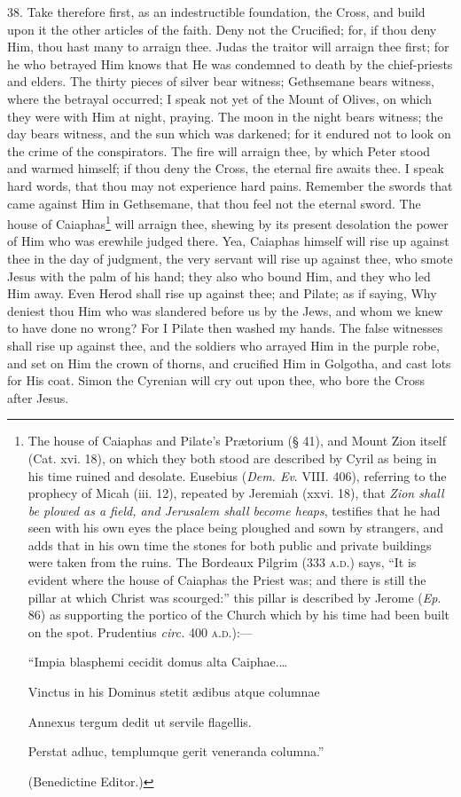 38. Take therefore first, as an indestructible foundation, the Cross, and build upon it the other articles of the faith. Deny not the Crucified; for, if thou deny Him, thou hast many to arraign thee. Judas the traitor will arraign thee first; for he who betrayed Him knows that He was condemned to death by the chief-priests and elders. The thirty pieces of silver bear witness; Gethsemane bears witness, where the betrayal occurred; I speak not yet of the Mount of Olives, on which they were with Him at night, praying. The moon in the night bears witness; the day bears witness, and the sun which was darkened; for it endured not to look on the crime of the conspirators. The fire will arraign thee, by which Peter stood and warmed himself; if thou deny the Cross, the eternal fire awaits thee. I speak hard words, that thou may not experience hard pains. Remember the swords that came against Him in Gethsemane, that thou feel not the eternal sword. The house of Caiaphas\footnote{The house of Caiaphas and Pilate’s Prætorium (§ 41), and Mount Zion itself (Cat. xvi. 18), on which they both stood are described by Cyril as being in his time ruined and desolate. Eusebius (\emph{Dem. Ev}. VIII. 406), referring to the prophecy of Micah (iii. 12), repeated by Jeremiah (xxvi. 18), that \emph{Zion shall be plowed as a field, and Jerusalem shall become heaps}, testifies that he had seen with his own eyes the place being ploughed and sown by strangers, and adds that in his own time the stones for both public and private buildings were taken from the ruins. The Bordeaux Pilgrim (333 \textsc{a.d.}) says, “It is evident where the house of Caiaphas the Priest was; and there is still the pillar at which Christ was scourged:” this pillar is described by Jerome (\emph{Ep}. 86) as supporting the portico of the Church which by his time had been built on the spot. Prudentius \emph{circ.} 400 \textsc{a.d.}):— \par “Impia blasphemi cecidit domus alta Caiphae.… \par Vinctus in his Dominus stetit ædibus atque columnae \par Annexus tergum dedit ut servile flagellis. \par Perstat adhuc, templumque gerit veneranda columna.” \par (Benedictine Editor.)} will arraign thee, shewing by its present desolation the power of Him who was erewhile judged there. Yea, Caiaphas himself will rise up against thee in the day of judgment, the very servant will rise up against thee, who smote Jesus with the palm of his hand; they also who bound Him, and they who led Him away. Even Herod shall rise up against thee; and Pilate; as if saying, Why deniest thou Him who was slandered before us by the Jews, and whom we knew to have done no wrong? For I Pilate then washed my hands. The false witnesses shall rise up against thee, and the soldiers who arrayed Him in the purple robe, and set on Him the crown of thorns, and crucified Him in Golgotha, and cast lots for His coat. Simon the Cyrenian will cry out upon thee, who bore the Cross after Jesus.

